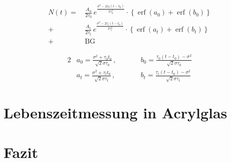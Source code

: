 \documentclass[11pt, a4paper]{article}
\numberwithin{equation}{section}
\DeclareMathOperator{\erf}{erf}
\begin{document}
\begin{align*}
	N(t) = \, &\frac{A_0}{2 \tau_0} \, e^{\frac{\sigma^2 - 2 \tau_0 (t - t_0)}{2 \tau_0^2}} \cdot \left\{ \erf(a_0) + \erf(b_0) \right\} \\
	+ &\frac{A_t}{2 \tau_t} \, e^{\frac{\sigma^2 - 2 \tau_t (t - t_0)}{2 \tau_t^2}} \cdot \left\{ \erf(a_t) + \erf(b_t) \right\}\\
	+ &\mathrm{BG}
\end{align*}

\begin{alignat*}{2}
	&a_0 = \frac{\sigma^2 + \tau_0 t_0}{\sqrt{2} \sigma \tau_0} \,\text{,} \qquad
	&&b_0 = \frac{\tau_0 (t - t_0) - \sigma^2}{\sqrt{2} \sigma \tau_0} \\
	&a_t = \frac{\sigma^2 + \tau_t t_0}{\sqrt{2} \sigma \tau_t} \,\text{,} \qquad
	&&b_t = \frac{\tau_t (t - t_0) - \sigma^2}{\sqrt{2} \sigma \tau_t}
\end{alignat*}






\section{Lebenszeitmessung in Acrylglas}

\section{Fazit}
\end{document}
